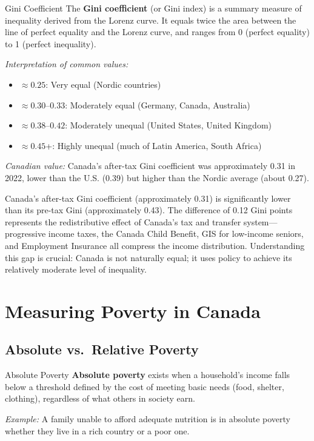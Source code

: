 \begin{defbox}{Gini Coefficient}
The \textbf{Gini coefficient} (or Gini index) is a summary measure of inequality derived from the Lorenz curve. It equals twice the area between the line of perfect equality and the Lorenz curve, and ranges from 0 (perfect equality) to 1 (perfect inequality).

\textit{Interpretation of common values:}
\begin{itemize}
  \item $\approx 0.25$: Very equal (Nordic countries)
  \item $\approx 0.30$--$0.33$: Moderately equal (Germany, Canada, Australia)
  \item $\approx 0.38$--$0.42$: Moderately unequal (United States, United Kingdom)
  \item $\approx 0.45$+: Highly unequal (much of Latin America, South Africa)
\end{itemize}

\textit{Canadian value:} Canada's after-tax Gini coefficient was approximately 0.31 in 2022, lower than the U.S. (0.39) but higher than the Nordic average (about 0.27).
\end{defbox}

\begin{keytakeaway}
Canada's after-tax Gini coefficient (approximately 0.31) is significantly lower than its pre-tax Gini (approximately 0.43). The difference of 0.12 Gini points represents the redistributive effect of Canada's tax and transfer system---progressive income taxes, the Canada Child Benefit, GIS for low-income seniors, and Employment Insurance all compress the income distribution. Understanding this gap is crucial: Canada is not naturally equal; it uses policy to achieve its relatively moderate level of inequality.
\end{keytakeaway}

\section{Measuring Poverty in Canada}

\subsection{Absolute vs.\ Relative Poverty}

\begin{defbox}{Absolute Poverty}
\textbf{Absolute poverty} exists when a household's income falls below a threshold defined by the cost of meeting basic needs (food, shelter, clothing), regardless of what others in society earn.

\textit{Example:} A family unable to afford adequate nutrition is in absolute poverty whether they live in a rich country or a poor one.
\end{defbox}

